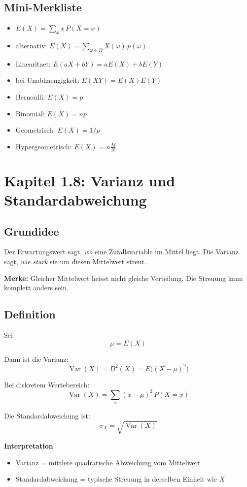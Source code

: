 \documentclass[a4paper,11pt]{article}
\begin{document}
\subsection{Mini-Merkliste}
\begin{itemize}
  \item $\displaystyle E(X)=\sum_x x\,P(X=x)$
  \item alternativ: $\displaystyle E(X)=\sum_{\omega \in \Omega} X(\omega)\,p(\omega)$
  \item Linearitaet: $\displaystyle E(aX+bY)=aE(X)+bE(Y)$
  \item bei Unabhaengigkeit: $\displaystyle E(XY)=E(X)E(Y)$
  \item Bernoulli: $\displaystyle E(X)=p$
  \item Binomial: $\displaystyle E(X)=np$
  \item Geometrisch: $\displaystyle E(X)=1/p$
  \item Hypergeometrisch: $\displaystyle E(X)=n\frac{M}{N}$
\end{itemize}

\section{Kapitel 1.8: Varianz und Standardabweichung}

\subsection{Grundidee}
Der Erwartungswert sagt, \emph{wo} eine Zufallsvariable im Mittel liegt.
Die Varianz sagt, \emph{wie stark} sie um diesen Mittelwert streut.

\textbf{Merke:}
Gleicher Mittelwert heisst nicht gleiche Verteilung. Die Streuung kann komplett anders sein.

\subsection{Definition}
Sei
\[
\mu = E(X)
\]

Dann ist die Varianz:
\[
\operatorname{Var}(X)=D^2(X)=E\big((X-\mu)^2\big)
\]

Bei diskretem Wertebereich:
\[
\operatorname{Var}(X)=\sum_x (x-\mu)^2\,P(X=x)
\]

Die Standardabweichung ist:
\[
\sigma_X=\sqrt{\operatorname{Var}(X)}
\]

\textbf{Interpretation}
\begin{itemize}
  \item Varianz = mittlere quadratische Abweichung vom Mittelwert
  \item Standardabweichung = typische Streuung in derselben Einheit wie $X$
\end{itemize}
\end{document}

